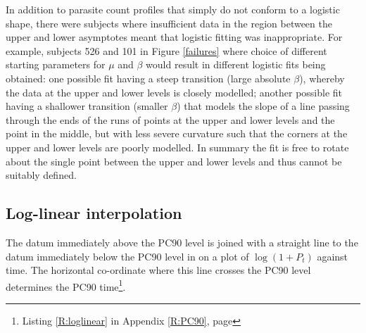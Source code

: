 In addition to parasite count profiles that simply do not conform to a logistic shape, there were subjects where insufficient data in the region between the upper and lower asymptotes meant that logistic fitting was inappropriate. For example, subjects 526 and 101 in Figure \ref{failures} where choice of different starting parameters for $\mu$ and $\beta$ would result in different logistic fits being obtained: one possible fit having a steep transition (large absolute $\beta$), whereby the data at the upper and lower levels is closely modelled; another possible fit having a shallower transition (smaller $\beta$) that models the slope of a line passing through the ends of the runs of points at the upper and lower levels and the point in the middle, but with less severe curvature such that the corners at the upper and lower levels are poorly modelled. In summary the fit is free to rotate about the single point between the upper and lower levels and thus cannot be suitably defined.

\subsection{Log-linear interpolation}
The datum immediately above the PC90 level is joined with a straight line to the datum immediately below the PC90 level in on a plot of $\log(1+P_{t})$ against time. The horizontal co-ordinate where this line crosses the PC90 level determines the PC90 time\footnote{Listing \ref{R:loglinear} in Appendix \ref{R:PC90}, page \pageref{R:loglinear}}.

